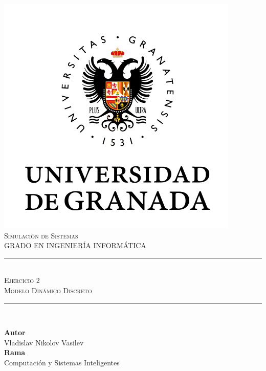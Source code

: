 \documentclass[11pt,a4paper]{article}
\newcommand{\asignatura}{Simulación de Sistemas}
\newcommand{\autor}{Vladislav Nikolov Vasilev}
\newcommand{\titulo}{Ejercicio 2}
\newcommand{\subtitulo}{Modelo Dinámico Discreto}
\begin{document}

\begin{titlepage}

\begin{minipage}{\textwidth}

\centering

\includegraphics[scale=0.5]{img/ugr.png}\\

\textsc{\Large \asignatura{}\\[0.2cm]}
\textsc{GRADO EN INGENIERÍA INFORMÁTICA}\\[1cm]

\noindent\rule[-1ex]{\textwidth}{1pt}\\[1.5ex]
\textsc{{\Huge \titulo\\[0.5ex]}}
\textsc{{\Large \subtitulo\\}}
\noindent\rule[-1ex]{\textwidth}{2pt}\\[3.5ex]

\end{minipage}

\vspace{0.5cm}

\begin{minipage}{\textwidth}

\centering

\textbf{Autor}\\ {\autor{}}\\[2.5ex]
\textbf{Rama}\\ {Computación y Sistemas Inteligentes}\\[2.5ex]
\vspace{0.3cm}


\end{minipage}
\end{titlepage}
\end{document}
